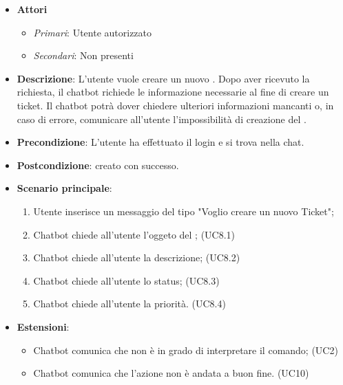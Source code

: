 \begin{itemize}
	\item \textbf{Attori}
	\begin{itemize} 
		\item \textit{Primari}: Utente autorizzato
		\item \textit{Secondari}: Non presenti 
	\end{itemize}
	\item \textbf{Descrizione}: L'utente vuole creare un nuovo . Dopo aver ricevuto la richiesta, il chatbot richiede le informazione necessarie al fine di creare un ticket. Il chatbot potrà dover chiedere ulteriori informazioni mancanti o, in caso di errore, comunicare all'utente l'impossibilità di creazione del .
	\item \textbf{Precondizione}: L'utente ha effettuato il login e si trova nella chat.
	\item \textbf{Postcondizione}:  creato con successo.
	\item \textbf{Scenario principale}: \begin{enumerate}
		\item Utente inserisce un messaggio del tipo "Voglio creare un nuovo Ticket";
		\item Chatbot chiede all'utente l'oggeto del ; (UC8.1)
    \item Chatbot chiede all'utente la descrizione; (UC8.2)
		\item Chatbot chiede all'utente lo status; (UC8.3)
		\item Chatbot chiede all'utente la priorità. (UC8.4)
	\end{enumerate}
	\item \textbf{Estensioni}: \begin{itemize}
		\item Chatbot comunica che non è in grado di interpretare il comando; (UC2)
		\item Chatbot comunica che l'azione non è andata a buon fine. (UC10)
	\end{itemize}
\end{itemize}
